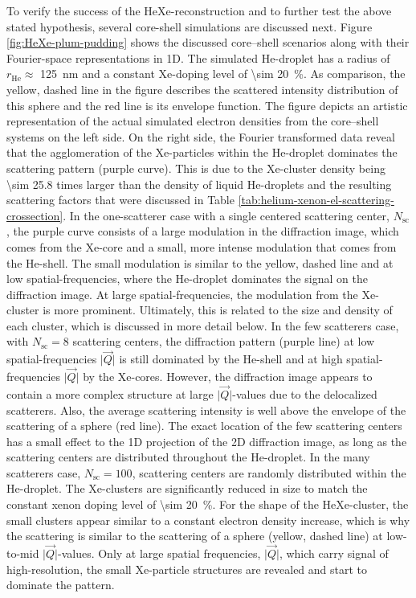 To verify the success of the HeXe-reconstruction and to further test the above stated hypothesis, several core-shell simulations are discussed next. Figure \ref{fig:HeXe-plum-pudding} shows the discussed core--shell scenarios along with their Fourier-space representations in 1D. The simulated He-droplet has a radius of $r_{\text{He}}\approx$ \SI{125}{\nano\meter} and a constant Xe-doping level of \SI{\sim 20}{\percent}. As comparison, the yellow, dashed line in the figure describes the scattered intensity distribution of this sphere and the red line is its envelope function. The figure depicts an artistic representation of the actual simulated electron densities from the core--shell systems on the left side. On the right side, the Fourier transformed data reveal that the agglomeration of the Xe-particles within the He-droplet dominates the scattering pattern (purple curve). This is due to the Xe-cluster density being \num{\sim 25.8} times larger than the density of liquid He-droplets and the resulting scattering factors that were discussed in Table \ref{tab:helium-xenon-el-scattering-crossection}. In the one-scatterer case with a single centered scattering center, $N_{\text{sc}}$, the purple curve consists of a large modulation in the diffraction image, which comes from the Xe-core and a small, more intense modulation that comes from the He-shell. The small modulation is similar to the yellow, dashed line and at low spatial-frequencies, where the He-droplet dominates the signal on the diffraction image. At large spatial-frequencies, the modulation from the Xe-cluster is more prominent. Ultimately, this is related to the size and density of each cluster, which is discussed in more detail below. In the few scatterers case, with $N_{\text{sc}}=8$ scattering centers, the diffraction pattern (purple line) at low spatial-frequencies $\lvert\vec{Q}\rvert$ is still dominated by the He-shell and at high spatial-frequencies $\lvert\vec{Q}\rvert$ by the Xe-cores. However, the diffraction image appears to contain a more complex structure at large $\lvert\vec{Q}\rvert$-values due to the delocalized scatterers. Also, the average scattering intensity is well above the envelope of the scattering of a sphere (red line). The exact location of the few scattering centers has a small effect to the 1D projection of the 2D diffraction image, as long as the scattering centers are distributed throughout the He-droplet. In the many scatterers case, $N_{\text{sc}}=100$, scattering centers are randomly distributed within the He-droplet. The Xe-clusters are significantly reduced in size to match the constant xenon doping level of \SI{\sim 20}{\percent}. For the shape of the HeXe-cluster, the small clusters appear similar to a constant electron density increase, which is why the scattering is similar to the scattering of a sphere (yellow, dashed line) at low-to-mid $\lvert\vec{Q}\rvert$-values. Only at large spatial frequencies, $\lvert\vec{Q}\rvert$, which carry signal of high-resolution, the small Xe-particle structures are revealed and start to dominate the pattern.\\[1\baselineskip]
